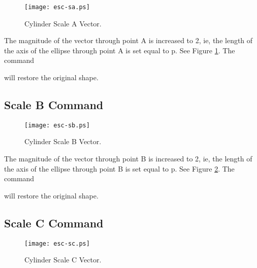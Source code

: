 \begin{figure}
\centering \texttt{[image: esc-sa.ps]}
\caption{Cylinder Scale A Vector.}
\label{esc-sa}
\end{figure}


The magnitude of the vector through point A is increased to 2, ie,
the length of the axis of the ellipse through point A is set equal to p.
See Figure \ref{esc-sa}.  The command


will restore the original shape.

\subsection{Scale B Command}

\begin{figure}
\centering \texttt{[image: esc-sb.ps]}
\caption{Cylinder Scale B Vector.}
\label{esc-sb}
\end{figure}


The magnitude of the vector through point B is increased to 2, ie,
the length of the axis of the ellipse through point B is set equal to p.
See Figure \ref{esc-sb}.  The command


will restore the original shape.

\subsection{Scale C Command}

\begin{figure}
\centering \texttt{[image: esc-sc.ps]}
\caption{Cylinder Scale C Vector.}
\label{esc-sc}
\end{figure}


